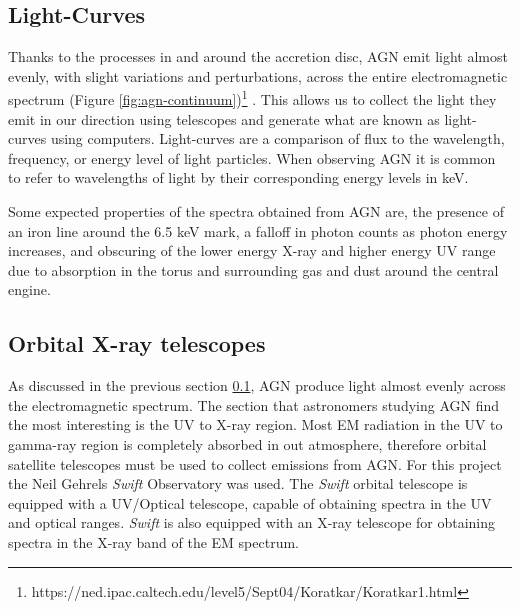 \documentclass[12pt, oneside]{smuthesis}
\begin{document}
\subsection{\sc Light-Curves} \label{lightcurves}
Thanks to the processes in and around the accretion disc, AGN emit light almost evenly, with slight variations and perturbations, across the entire electromagnetic spectrum (Figure \ref{fig:agn-continuum})\footnote{https://ned.ipac.caltech.edu/level5/Sept04/Koratkar/Koratkar1.html} \cite{koratkar}. This allows us to collect the light they emit in our direction using telescopes and generate what are known as light-curves using computers. Light-curves are a comparison of flux to the wavelength, frequency, or energy level of light particles. When observing AGN it is common to refer to wavelengths of light by their corresponding energy levels in keV.

Some expected properties of the spectra obtained from AGN are, the presence of an iron line around the 6.5 keV mark, a falloff in photon counts as photon energy increases, and obscuring of the lower energy X-ray and higher energy UV range due to absorption in the torus and surrounding gas and dust around the central engine.

\subsection{\sc Orbital X-ray telescopes} \label{xrayTelesopes}

As discussed in the previous section \ref{lightcurves}, AGN produce light almost evenly across the electromagnetic spectrum. The section that astronomers studying AGN find the most interesting is the UV to X-ray region. Most EM radiation in the UV to gamma-ray region is completely absorbed in out atmosphere, therefore orbital satellite telescopes must be used to collect emissions from AGN. For this project the Neil Gehrels \textit{Swift} Observatory was used. The \textit{Swift} orbital telescope is equipped with a UV/Optical telescope, capable of obtaining spectra in the UV and optical ranges. \textit{Swift} is also equipped with an X-ray telescope for obtaining spectra in the X-ray band of the EM spectrum. 
\end{document}
